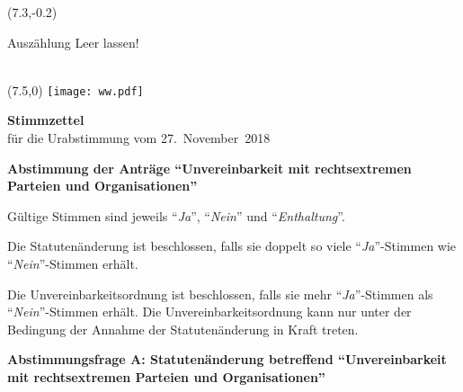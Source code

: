 \documentclass[11pt, a4paper]{scrartcl}
\newcommand{\votingdate}{27.~November~2018}
\newcommand{\ja}{\enquote{\textit{Ja}}}
\newcommand{\nein}{\enquote{\textit{Nein}}}
\newcommand{\enthaltung}{\enquote{\textit{Enthaltung}}}
\begin{document}
{\begin{minipage}[t][12.5cm][t]{\textwidth}
\begin{textblock}{6}(7.3,-0.2)
\begin{framed}
Auszählung \hfill Leer lassen! \\
\vspace{1.5cm} ~ \\
\end{framed}
\end{textblock}


\end{minipage}

\newpage

\begin{minipage}[t][12.5cm][t]{17.4cm}

\begin{textblock}{6}(7.5,0)
\texttt{[image: ww.pdf]}
\end{textblock}

{\LARGE\textbf{Stimmzettel}} \\
für die Urabstimmung vom \votingdate{} \\

\vspace{2cm}

{\Large\textbf{Abstimmung der Anträge \enquote{Unvereinbarkeit mit rechtsextremen Parteien und Organisationen}}}

\vspace{0.3cm}

Gültige Stimmen sind jeweils \ja{}, \nein{} und \enthaltung{}.

\vspace{0.15cm}

Die Statutenänderung ist beschlossen, falls sie doppelt so viele \ja{}-Stimmen wie \nein{}-Stimmen erhält.

\vspace{0.15cm}

Die Unvereinbarkeitsordnung ist beschlossen, falls sie mehr \ja{}-Stimmen als \nein{}-Stimmen erhält. Die Unvereinbarkeitsordnung kann nur unter der Bedingung der Annahme der Statutenänderung in Kraft treten.

\vspace{0.15cm}



\vspace{1cm}

\textbf{Abstimmungsfrage A: Statutenänderung betreffend \enquote{Unvereinbarkeit mit rechtsextremen Parteien und Organisationen}}

\vspace{0.5cm}


\end{minipage}}
\end{document}

